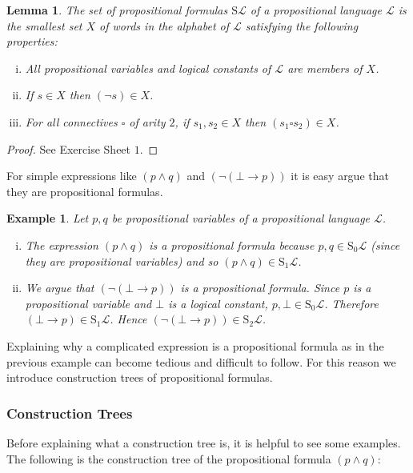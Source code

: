 \documentclass[11pt]{article}
\newcommand{\PF}{\mathrm{S}}
\newtheorem{example}[theorem]{Example}
\newtheorem{lemma}[theorem]{Lemma}
\newcommand{\mcal}[1]{\mathcal{#1}}
\begin{document}
\begin{lemma}
The set of propositional formulas $\PF\mcal{L}$ of a propositional language $\mcal{L}$ is the smallest set $X$ of words in the alphabet of $\mcal{L}$ satisfying the following properties:
\begin{enumerate}[(i)]
\item All propositional variables and logical constants of $\mcal{L}$ are members of $X$.
\item If $s\in X$ then $(\neg s)\in X$.
\item For all connectives $\square$ of arity $2$, if $s_1,s_2\in X$ then $(s_1\square s_2)\in X$.
\end{enumerate}
\end{lemma}
\begin{proof}
See Exercise Sheet $1$.
\end{proof}





For simple expressions like $(p\wedge q)$ and $(\neg (\bot\rightarrow p))$ it is easy argue that they are propositional formulas.
\begin{example}
Let $p,q$ be propositional variables of a propositional language $\mcal{L}$.
\begin{enumerate}[(i)]
\item
The expression $(p\wedge q)$ is a propositional formula because $p,q\in \PF_0\mcal{L}$ (since they are propositional variables) and so $(p\wedge q)\in \PF_1\mcal{L}$.
\item We argue that $(\neg (\bot\rightarrow p))$ is a propositional formula. Since $p$ is a propositional variable and $\bot$ is a logical constant, $p,\bot\in \PF_0\mcal{L}$. Therefore $(\bot\rightarrow p)\in \PF_1\mcal{L}$. Hence $(\neg (\bot\rightarrow p))\in\PF_2\mcal{L}$.
\end{enumerate}
\end{example}

Explaining why a complicated expression is a propositional formula as in the previous example can become tedious and difficult to follow. For this reason we introduce construction trees of propositional formulas.




\subsubsection*{Construction Trees}

Before explaining what a construction tree is, it is helpful to see some examples. The following is the construction tree of the propositional formula $(p\wedge q)$:
\end{document}

